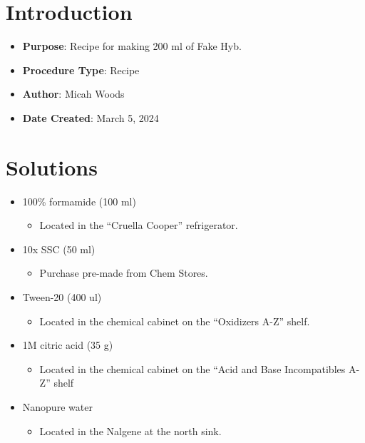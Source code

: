 \documentclass[
  letterpaper,
  DIV=11,
  numbers=noendperiod]{scrreprt}
\providecommand{\tightlist}{%
  \setlength{\itemsep}{0pt}\setlength{\parskip}{0pt}}\usepackage{longtable,booktabs,array}
\begin{document}
\hypertarget{introduction-106}{%
\section{Introduction}\label{introduction-106}}

\begin{itemize}
\tightlist
\item
  \textbf{Purpose}: Recipe for making 200 ml of Fake Hyb.
\item
  \textbf{Procedure Type}: Recipe
\item
  \textbf{Author}: Micah Woods
\item
  \textbf{Date Created}: March 5, 2024
\end{itemize}

\hypertarget{solutions-92}{%
\section{Solutions}\label{solutions-92}}

\begin{itemize}
\tightlist
\item
  100\% formamide (100 ml)

  \begin{itemize}
  \tightlist
  \item
    Located in the ``Cruella Cooper'' refrigerator.
  \end{itemize}
\item
  10x SSC (50 ml)

  \begin{itemize}
  \tightlist
  \item
    Purchase pre-made from Chem Stores.
  \end{itemize}
\item
  Tween-20 (400 ul)

  \begin{itemize}
  \tightlist
  \item
    Located in the chemical cabinet on the ``Oxidizers A-Z'' shelf.
  \end{itemize}
\item
  1M citric acid (35 g)

  \begin{itemize}
  \tightlist
  \item
    Located in the chemical cabinet on the ``Acid and Base Incompatibles
    A-Z'' shelf
  \end{itemize}
\item
  Nanopure water

  \begin{itemize}
  \tightlist
  \item
    Located in the Nalgene at the north sink.
  \end{itemize}
\end{itemize}
\end{document}
